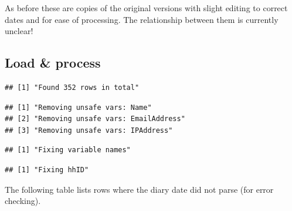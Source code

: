\documentclass[]{article}
\begin{document}
As before these are copies of the original versions with slight editing
to correct dates and for ease of processing. The relationship between
them is currently unclear!

\subsection{Load \& process}\label{load-process-1}

\begin{verbatim}
## [1] "Found 352 rows in total"
\end{verbatim}

\begin{verbatim}
## [1] "Removing unsafe vars: Name"        
## [2] "Removing unsafe vars: EmailAddress"
## [3] "Removing unsafe vars: IPAddress"
\end{verbatim}

\begin{verbatim}
## [1] "Fixing variable names"
\end{verbatim}

\begin{verbatim}
## [1] "Fixing hhID"
\end{verbatim}

The following table lists rows where the diary date did not parse (for
error checking).
\end{document}
